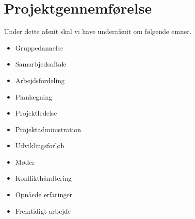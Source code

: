 \chapter{Projektgennemførelse}

Under dette afsnit skal vi have underafsnit om følgende emner.

\begin{itemize}
	\item Gruppedannelse
	\item Samarbjedsaftale
	\item Arbejdsfordeling
	\item Planlægning
	\item Projektledelse
	\item Projektadministration
	\item Udviklingsforløb
	\item Møder
	\item Konflikthåndtering
	\item Opnåede erfaringer
	\item Fremtidigt arbejde
\end{itemize}